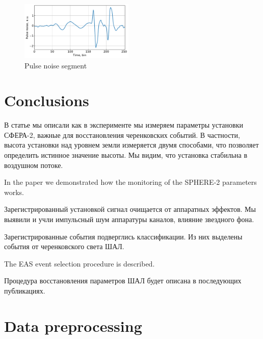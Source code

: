 \documentclass[final,5p,times,twocolumn]{elsarticle}
\begin{document}
\begin{figure}[tb]
\includegraphics[width=0.48\textwidth]{figs/pulse_noise_segment.pdf}
\caption{Pulse noise segment}
\label{fig:pulse_noise_segment}
\end{figure}


\section{Conclusions \label{sect:conclusions}}

{
\Russian

В статье мы описали как в эксперименте мы измеряем параметры установки  СФЕРА-2, важные для восстановления черенковских событий.  В частности, высота установки над уровнем земли измеряется двумя способами, что позволяет определить истинное значение высоты. Мы видим, что установка стабильна в воздушном потоке.} 
In the paper we demonstrated how the monitoring of the SPHERE-2 parameters works. 

{
\Russian
Зарегистрированный установкой сигнал очищается от аппаратных эффектов. Мы выявили и учли импульсный шум аппаратуры каналов, влияние звездного фона. 

Зарегистрированные события подверглись классификации. Из них выделены события от черенковского света ШАЛ. }The EAS event selection procedure is described.

{
\Russian
Процедура восстановления параметров ШАЛ будет описана в последующих публикациях.
}




\appendix



\section{Data preprocessing\label{sect:preprocessing}}
\end{document}
